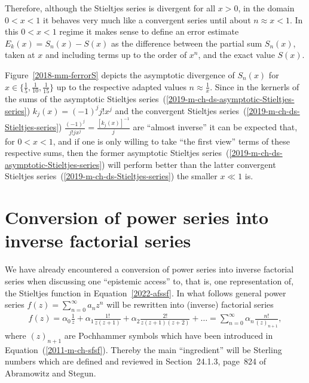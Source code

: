 {\begin{itemize}
Therefore, although the
Stieltjes series is divergent for all $x>0$, in the domain $0<x<1$
it behaves very much like a convergent series until
about $n \approx x < 1$. In this $0< x < 1$ regime it makes sense to define an error estimate $E_k(x)=S_n(x)-S(x)$
as the difference between the partial sum $S_n(x)$, taken at $x$ and including terms up to the order of $x^n$,
and the exact value $S(x)$.

Figure~\ref{2018-mm-ferrorS}
depicts the asymptotic divergence of $S_n(x)$ for
$x\in \{\frac{1}{5},\frac{1}{10},\frac{1}{15}\}$
up to the respective adapted values $n \approx \frac{1}{x}$.
Since in the kernerls of the sums of the asymptotic Stieltjes series~(\ref{2019-m-ch-ds-asymptotic-Stieltjes-series})
$k_j(x)= (-1)^j j! x^j $
and the convergent Stieltjes series~(\ref{2019-m-ch-ds-Stieltjes-series})
$\frac{(-1)^j}{j!j x^j} = \frac{\left[k_j(x)\right]^{-1}}{ j }$
are ``almost inverse''   it can be expected that, for $0<x<1$, and if one is only willing to take ``the first view'' terms of these respective sums,  then the
former asymptotic Stieltjes series~(\ref{2019-m-ch-ds-asymptotic-Stieltjes-series}) will perform better than the latter
convergent Stieltjes series~(\ref{2019-m-ch-ds-Stieltjes-series})
the smaller $x\ll 1$   is.


\end{itemize}

 \eexample
 }

\section{Conversion of power series into inverse factorial series}
\label{2022-factser}


We have already encountered a conversion of power series into inverse factorial series when discussing one ``epistemic access'' to, that is,
one representation of, the Stieltjes function in Equation~\ref{2022-afssf}.
In what follows  general power series
$f(z) = \sum_{n=0}^\infty a_n z^n$ will be rewritten
into (inverse) factorial series~\cite[-90mm]{Watson1912,Doetsch1972}
\begin{equation}
\begin{split}
f(z)
=
\alpha_0 \frac{1}{z}
+
\alpha_1 \frac{1!}{z(z+1)}
+
\alpha_2 \frac{2!}{z(z+1)(z+2)}+
\ldots
= \sum_{n=0}^\infty \alpha_n \frac{n!}{(z)_{n+1}}
,
\end{split}
\label{2022-m-ch-dsfs}
\end{equation}
where $(z)_{n+1}$ are Pochhammer symbols
which have been introduced in Equation~(\ref{2011-m-ch-sfsf}).
Thereby the main ``ingredient'' will be Sterling numbers
which are defined and reviewed in Section~24.1.3, page~824 of Abramowitz and Stegun\cite[-20mm]{abramowitz:1964:hmf}.


